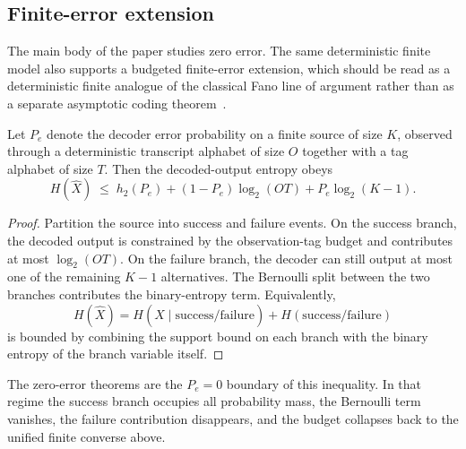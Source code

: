 \subsection{Finite-error extension}\label{sec:finite-error-extension}

The main body of the paper studies zero error. The same deterministic finite model also supports a budgeted finite-error extension, which should be read as a deterministic finite analogue of the classical Fano line of argument rather than as a separate asymptotic coding theorem~\cite{fano1961transmission,witsenhausen1975conditional,cover2006elements,kelly2011improved}.

\begin{proposition}\label{thm:finite-error-budgeted}
Let $P_e$ denote the decoder error probability on a finite source of size $K$, observed through a deterministic transcript alphabet of size $O$ together with a tag alphabet of size $T$. Then the decoded-output entropy obeys
\[
H(\hat X)
\;\le\;
h_2(P_e) + (1-P_e)\log_2 (OT) + P_e \log_2 (K-1).
\]
\end{proposition}

\begin{proof}
Partition the source into success and failure events. On the success branch, the decoded output is constrained by the observation-tag budget and contributes at most $\log_2(OT)$. On the failure branch, the decoder can still output at most one of the remaining $K-1$ alternatives. The Bernoulli split between the two branches contributes the binary-entropy term. Equivalently,
\[
H(\hat X)=H(\hat X \mid \text{success/failure}) + H(\text{success/failure})
\]
is bounded by combining the support bound on each branch with the binary entropy of the branch variable itself.
\end{proof}

The zero-error theorems are the $P_e=0$ boundary of this inequality. In that regime the success branch occupies all probability mass, the Bernoulli term vanishes, the failure contribution disappears, and the budget collapses back to the unified finite converse above.
